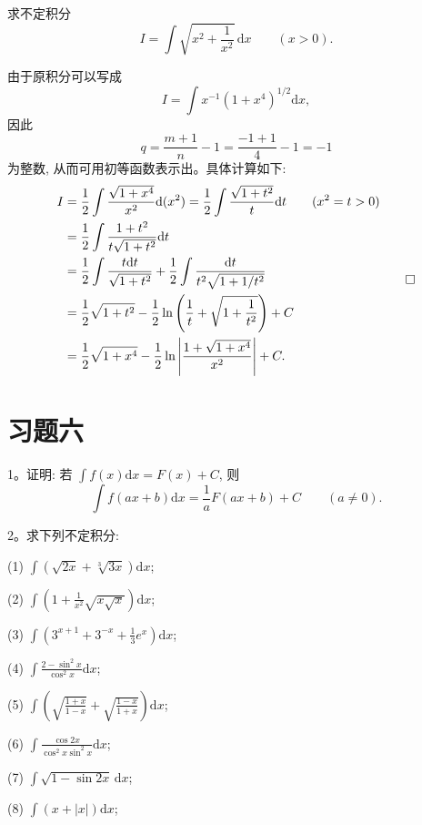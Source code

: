 \begin{example}\label{example:ma-6-3-9}
求不定积分
\[
  I=\int\sqrt{x^2+\frac1{x^2}}\,\mathrm dx\qquad(x>0).
\]
\end{example}

\begin{solve}
由于原积分可以写成
\[
  I=\int x^{-1}(1+x^4)^{1/2}\mathrm dx,
\]
因此
\[
  q=\frac{m+1}n-1=\frac{-1+1}4-1=-1
\]
为整数, 从而可用初等函数表示出。具体计算如下:
\[
\begin{aligned}
  I
  &=
  \frac12\int\frac{\sqrt{1+x^4}}{x^2}\mathrm d(x^2)
  =
  \frac12\int\frac{\sqrt{1+t^2}}{t}\mathrm dt
  \qquad(x^2=t>0)\\
  &=
  \frac12\int\frac{1+t^2}{t\sqrt{1+t^2}}\mathrm dt\\
  &=
  \frac12\int\frac{t\mathrm dt}{\sqrt{1+t^2}}
  +\frac12\int\frac{\mathrm dt}{t^2\sqrt{1+1/t^2}}\\
  &=
  \frac12\sqrt{1+t^2}-\frac12\ln\left(\frac1t+\sqrt{1+\frac1{t^2}}\right)+C\\
  &=
  \frac12\sqrt{1+x^4}
  -\frac12\ln\left|\frac{1+\sqrt{1+x^4}}{x^2}\right|+C.
\end{aligned}
\qedhere
\]
\end{solve}


\section*{习题六}
{}
\label{exercises:ma-6}

1。证明: 若 $\displaystyle \int f(x)\mathrm dx=F(x)+C$, 则
\[
  \int f(ax+b)\mathrm dx=\frac1aF(ax+b)+C\qquad(a\ne0).
\]

2。求下列不定积分:

(1) $\displaystyle \int\left(\sqrt{2x}+\sqrt[3]{3x}\right)\mathrm dx$;

(2) $\displaystyle \int\left(1+\frac1{x^2}\sqrt{x\sqrt x}\right)\mathrm dx$;

(3) $\displaystyle \int\left(3^{x+1}+3^{-x}+\frac13e^x\right)\mathrm dx$;

(4) $\displaystyle \int\frac{2-\sin^2x}{\cos^2x}\mathrm dx$;

(5) $\displaystyle \int\left(\sqrt{\frac{1+x}{1-x}}+\sqrt{\frac{1-x}{1+x}}\right)\mathrm dx$;

(6) $\displaystyle \int\frac{\cos2x}{\cos^2x\sin^2x}\mathrm dx$;

(7) $\displaystyle \int\sqrt{1-\sin2x}\,\mathrm dx$;

(8) $\displaystyle \int(x+|x|)\mathrm dx$;

